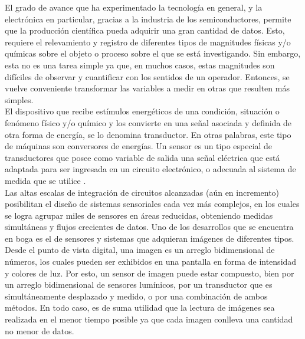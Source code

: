 El grado de avance que ha experimentado la tecnología en general, y la electrónica en particular, gracias a la industria de los semiconductores, permite que la producción científica pueda adquirir una gran cantidad de datos. Esto, requiere el relevamiento y registro de diferentes tipos de magnitudes físicas y/o químicas sobre el objeto o proceso sobre el que se está investigando. Sin embargo, esta no es una tarea simple ya que, en muchos casos, estas magnitudes son difíciles de observar y cuantificar con los sentidos de un operador. Entonces, se vuelve conveniente transformar las variables a medir en otras que resulten más simples.\\

El dispositivo que recibe estímulos energéticos de una condición, situación o fenómeno físico y/o químico y los convierte en una señal asociada y definida de otra forma de energía, se lo denomina transductor\cite{Pallas-Areny2001}\cite{considine1971encyclopedia}. En otras palabras, este tipo de máquinas son conversores de energías\cite{considine1971encyclopedia}\cite{Pallas-Areny2001}\cite{PerezGarcia2008}. Un sensor es un tipo especial de transductores que posee como variable de salida una señal eléctrica que está adaptada para ser ingresada en un circuito electrónico, o adecuada al sistema de medida que se utilice \cite{Fraden2010}\cite{Slawinski2011}\cite{Ogata2002}.\\

Las altas escalas de integración de circuitos alcanzadas (aún en incremento) posibilitan el diseño de sistemas sensoriales cada vez más complejos, en los cuales se logra agrupar miles de sensores en áreas reducidas, obteniendo medidas simultáneas y flujos crecientes de datos. Uno de los desarrollos que se encuentra en boga es el de sensores y sistemas que adquieran imágenes de diferentes tipos. Desde el punto de vista digital, una imagen es un arreglo bidimensional de números, los cuales pueden ser exhibidos en una pantalla en forma de intensidad y colores de luz. Por esto, un sensor de imagen puede estar compuesto, bien por un arreglo bidimensional de sensores lumínicos, por un transductor que es simultáneamente desplazado y medido, o por una combinación de ambos métodos. En todo caso, es de suma utilidad que la lectura de imágenes sea realizada en el menor tiempo posible ya que cada imagen conlleva una cantidad no menor de datos.\\

